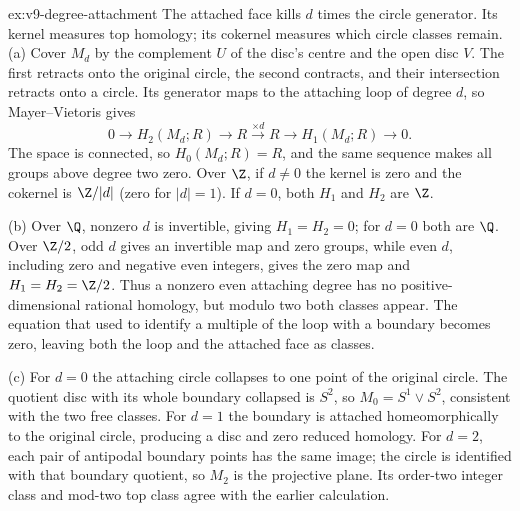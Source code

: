 \begin{solution}{ex:v9-degree-attachment}
\idea The attached face kills $d$ times the circle generator. Its kernel measures top homology; its cokernel measures which circle classes remain.
\writeup (a) Cover $M_d$ by the complement $U$ of the disc's centre and the open disc $V$. The first retracts onto the original circle, the second contracts, and their intersection retracts onto a circle. Its generator maps to the attaching loop of degree $d$, so Mayer--Vietoris gives
\[
0\to H_2(M_d;R)\to R\xrightarrow{\times d}R\to H_1(M_d;R)\to0.
\]
The space is connected, so $H_0(M_d;R)=R$, and the same sequence makes all groups above degree two zero. Over $\Z$, if $d\ne0$ the kernel is zero and the cokernel is $\Z/|d|$ (zero for $|d|=1$). If $d=0$, both $H_1$ and $H_2$ are $\Z$.

(b) Over $\Q$, nonzero $d$ is invertible, giving $H_1=H_2=0$; for $d=0$ both are $\Q$. Over $\Z/2$, odd $d$ gives an invertible map and zero groups, while even $d$, including zero and negative even integers, gives the zero map and $H_1=H_2=\Z/2$. Thus a nonzero even attaching degree has no positive-dimensional rational homology, but modulo two both classes appear. The equation that used to identify a multiple of the loop with a boundary becomes zero, leaving both the loop and the attached face as classes.

(c) For $d=0$ the attaching circle collapses to one point of the original circle. The quotient disc with its whole boundary collapsed is $S^2$, so $M_0=S^1\vee S^2$, consistent with the two free classes. For $d=1$ the boundary is attached homeomorphically to the original circle, producing a disc and zero reduced homology. For $d=2$, each pair of antipodal boundary points has the same image; the circle is identified with that boundary quotient, so $M_2$ is the projective plane. Its order-two integer class and mod-two top class agree with the earlier calculation.
\end{solution}

